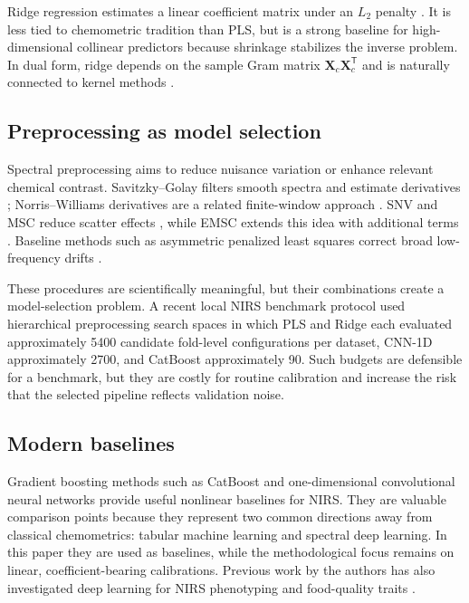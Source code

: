\documentclass[11pt,a4paper]{article}
\newcommand{\X}{\mathbf{X}}
\newcommand{\transpose}{^{\mathsf T}}
\begin{document}
Ridge regression estimates a linear coefficient matrix under an $L_2$ penalty
\citep{hoerl1970ridge}.  It is less tied to chemometric tradition than PLS, but
is a strong baseline for high-dimensional collinear predictors because
shrinkage stabilizes the inverse problem.  In dual form, ridge depends on the
sample Gram matrix $\X_c\X_c\transpose$ and is naturally connected to kernel
methods \citep{scholkopf2002learning,hastie2009elements}.

\subsection{Preprocessing as model selection}

Spectral preprocessing aims to reduce nuisance variation or enhance relevant
chemical contrast.  Savitzky--Golay filters smooth spectra and estimate
derivatives \citep{savitzky1964smoothing}; Norris--Williams derivatives are a
related finite-window approach \citep{norris1976influence}.  SNV and MSC reduce
scatter effects \citep{barnes1989standard,geladi1985linearization}, while EMSC
extends this idea with additional terms \citep{martens1991extended}.  Baseline
methods such as asymmetric penalized least squares correct broad low-frequency
drifts \citep{eilers2003perfect,zhang2010baseline}.

These procedures are scientifically meaningful, but their combinations create
a model-selection problem.  A recent local NIRS benchmark protocol used
hierarchical preprocessing search spaces in which PLS and Ridge each evaluated
approximately 5400 candidate fold-level configurations per dataset, CNN-1D
approximately 2700, and CatBoost approximately 90.  Such budgets are defensible
for a benchmark, but they are costly for routine calibration and increase the
risk that the selected pipeline reflects validation noise.

\subsection{Modern baselines}

Gradient boosting methods such as CatBoost \citep{prokhorenkova2018catboost}
and one-dimensional convolutional neural networks
\citep{cui2018modern,mishra2022deep} provide useful nonlinear baselines for
NIRS.  They are valuable comparison points because they represent two common
directions away from classical chemometrics: tabular machine learning and
spectral deep learning.  In this paper they are used as baselines, while the
methodological focus remains on linear, coefficient-bearing calibrations.
Previous work by the authors has also investigated deep learning for NIRS
phenotyping and food-quality traits \citep{vasseur2022perspective,houngbo2024cnn,vaillant2024nirspredict}.
\end{document}
